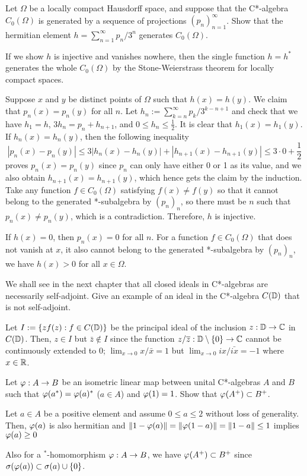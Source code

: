 \documentclass{../../small}
\begin{document}
\begin{prb}
Let $\Omega$ be a locally compact Hausdorff space, and suppose that the C*-algebra $C_0(\Omega)$ is generated by a sequence of projections $(p_n)_{n=1}^\infty$.
Show that the hermitian element $h=\sum_{n=1}^\infty p_n/3^n$ generates $C_0(\Omega)$.
\end{prb}
\begin{sol}
If we show $h$ is injective and vanishes nowhere, then the single function $h=h^*$ generates the whole $C_0(\Omega)$ by the Stone-Weierstrass theorem for locally compact spaces.

Suppose $x$ and $y$ be distinct points of $\Omega$ such that $h(x)=h(y)$.
We claim that $p_n(x)=p_n(y)$ for all $n$.
Let $h_n:=\sum_{k=n}^\infty p_k/3^{k-n+1}$ and check that we have $h_1=h$, $3h_n=p_n+h_{n+1}$, and $0\le h_n\le\frac12$.
It is clear that $h_1(x)=h_1(y)$.
If $h_n(x)=h_n(y)$, then the following inequality
\[|p_n(x)-p_n(y)|\le3|h_n(x)-h_n(y)|+|h_{n+1}(x)-h_{n+1}(y)|\le3\cdot0+\frac12\]
proves $p_n(x)=p_n(y)$ since $p_n$ can only have either 0 or 1 as its value, and we also obtain $h_{n+1}(x)=h_{n+1}(y)$, which hence gets the claim by the induction.
Take any function $f\in C_0(\Omega)$ satisfying $f(x)\ne f(y)$ so that it cannot belong to the generated *-subalgebra by $(p_n)_n$, so there must be $n$ such that $p_n(x)\ne p_n(y)$, which is a contradiction.
Therefore, $h$ is injective.

If $h(x)=0$, then $p_n(x)=0$ for all $n$.
For a function $f\in C_0(\Omega)$ that does not vanish at $x$, it also cannot belong to the generated *-subalgebra by $(p_n)_n$, we have $h(x)>0$ for all $x\in\Omega$.
\end{sol}


\begin{prb}
We shall see in the next chapter that all closed ideals in C*-algebras are necessarily self-adjoint.
Give an example of an ideal in the C*-algebra $C(\mathbb{D})$ that is not self-adjoint.
\end{prb}
\begin{sol}
Let $I:=\{zf(z):f\in C(\mathbb{D})\}$ be the principal ideal of the inclusion $z:\mathbb{D}\to\mathbb{C}$ in $C(\mathbb{D})$.
Then, $z\in I$ but $\bar z\notin I$ since the function $z/\overline z:\mathbb{D}\setminus\{0\}\to\mathbb{C}$ cannot be continuously extended to 0; $\lim_{x\to0}x/\bar{x}=1$ but $\lim_{x\to0}ix/\bar{ix}=-1$ where $x\in\mathbb{R}$.
\end{sol}


\begin{prb}
Let $\varphi:A\to B$ be an isometric linear map between unital C*-algebras $A$ and $B$ such that $\varphi(a^*)=\varphi(a)^*$ ($a\in A$) and $\varphi(1)=1$.
Show that $\varphi(A^+)\subset B^+$.
\end{prb}
\begin{sol}
Let $a\in A$ be a positive element and assume $0\le a\le2$ without loss of generality.
Then, $\varphi(a)$ is also hermitian and $\|1-\varphi(a)\|=\|\varphi(1-a)\|=\|1-a\|\le1$ implies $\varphi(a)\ge0$
\end{sol}
\begin{rmk}
Also for a $^*$-homomorphism $\varphi:A\to B$, we have $\varphi(A^+)\subset B^+$ since $\sigma(\varphi(a))\subset\sigma(a)\cup\{0\}$.
\end{rmk}
\end{document}
